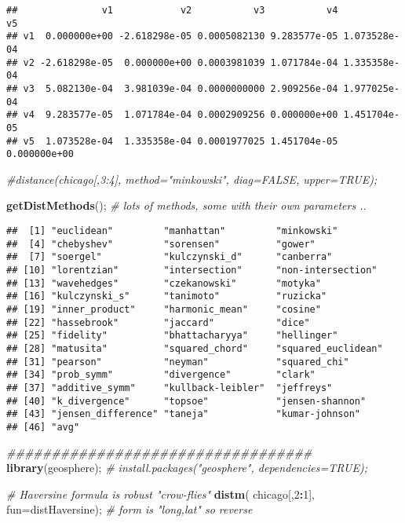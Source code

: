 \documentclass[
]{article}
\newenvironment{Shaded}{\begin{snugshade}}{\end{snugshade}}
\newcommand{\CommentTok}[1]{\textcolor[rgb]{0.56,0.35,0.01}{\textit{#1}}}
\newcommand{\DataTypeTok}[1]{\textcolor[rgb]{0.13,0.29,0.53}{#1}}
\newcommand{\DecValTok}[1]{\textcolor[rgb]{0.00,0.00,0.81}{#1}}
\newcommand{\KeywordTok}[1]{\textcolor[rgb]{0.13,0.29,0.53}{\textbf{#1}}}
\newcommand{\NormalTok}[1]{#1}
\newcommand{\OperatorTok}[1]{\textcolor[rgb]{0.81,0.36,0.00}{\textbf{#1}}}
\begin{document}
\begin{verbatim}
##               v1            v2           v3           v4           v5
## v1  0.000000e+00 -2.618298e-05 0.0005082130 9.283577e-05 1.073528e-04
## v2 -2.618298e-05  0.000000e+00 0.0003981039 1.071784e-04 1.335358e-04
## v3  5.082130e-04  3.981039e-04 0.0000000000 2.909256e-04 1.977025e-04
## v4  9.283577e-05  1.071784e-04 0.0002909256 0.000000e+00 1.451704e-05
## v5  1.073528e-04  1.335358e-04 0.0001977025 1.451704e-05 0.000000e+00
\end{verbatim}

\begin{Shaded}
\begin{Highlighting}[]
\CommentTok{\#distance(chicago[,3:4], method="minkowski", diag=FALSE, upper=TRUE);}

\KeywordTok{getDistMethods}\NormalTok{();  }\CommentTok{\# lot\textquotesingle{}s of methods, some with their own parameters ..}
\end{Highlighting}
\end{Shaded}

\begin{verbatim}
##  [1] "euclidean"         "manhattan"         "minkowski"        
##  [4] "chebyshev"         "sorensen"          "gower"            
##  [7] "soergel"           "kulczynski_d"      "canberra"         
## [10] "lorentzian"        "intersection"      "non-intersection" 
## [13] "wavehedges"        "czekanowski"       "motyka"           
## [16] "kulczynski_s"      "tanimoto"          "ruzicka"          
## [19] "inner_product"     "harmonic_mean"     "cosine"           
## [22] "hassebrook"        "jaccard"           "dice"             
## [25] "fidelity"          "bhattacharyya"     "hellinger"        
## [28] "matusita"          "squared_chord"     "squared_euclidean"
## [31] "pearson"           "neyman"            "squared_chi"      
## [34] "prob_symm"         "divergence"        "clark"            
## [37] "additive_symm"     "kullback-leibler"  "jeffreys"         
## [40] "k_divergence"      "topsoe"            "jensen-shannon"   
## [43] "jensen_difference" "taneja"            "kumar-johnson"    
## [46] "avg"
\end{verbatim}

\begin{Shaded}
\begin{Highlighting}[]
\CommentTok{\#\#\#\#\#\#\#\#\#\#\#\#\#\#\#\#\#\#\#\#\#\#\#\#\#\#\#\#\#\#\#\#\#\#}
\KeywordTok{library}\NormalTok{(geosphere);  }\CommentTok{\# install.packages("geosphere", dependencies=TRUE);}

\CommentTok{\# Haversine formula is robust "crow{-}flies"}
\KeywordTok{distm}\NormalTok{( chicago[,}\DecValTok{2}\OperatorTok{:}\DecValTok{1}\NormalTok{], }\DataTypeTok{fun=}\NormalTok{distHaversine);  }\CommentTok{\# form is "long,lat" so reverse }
\end{Highlighting}
\end{Shaded}
\end{document}
